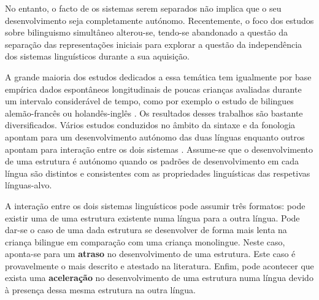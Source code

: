 \documentclass[output=paper]{LSP/langsci}
\begin{document}
No entanto, o facto de os sistemas serem separados não implica que o seu desenvolvimento seja completamente autónomo. Recentemente, o foco dos estudos sobre bilinguismo simultâneo alterou-se, tendo-se abandonado a questão da separação das representações iniciais para explorar a questão da independência dos sistemas linguísticos durante a sua aquisição. 

A grande maioria dos estudos dedicados a essa temática tem igualmente por base empírica dados espontâneos longitudinais de poucas crianças avaliadas durante um intervalo considerável de tempo, como por exemplo o estudo de bilingues alemão-francês \citep{leisel1989} ou holandês-inglês \citep{dehouwer1990}. Os resultados desses trabalhos são bastante diversificados. Vários estudos conduzidos no âmbito da sintaxe e da fonologia apontam para um desenvolvimento autónomo das duas línguas enquanto outros apontam para interação entre os dois sistemas \citep{genesee_etal2004,meisel2004}. Assume-se que o desenvolvimento de uma estrutura é autónomo quando os padrões de desenvolvimento em cada língua são distintos e consistentes com as propriedades linguísticas das respetivas línguas-alvo. 

A interação entre os dois sistemas linguísticos pode assumir três formatos: pode existir uma \textbf{} de uma estrutura existente numa língua para a outra língua. Pode dar-se o caso de uma dada estrutura se desenvolver de forma mais lenta na criança bilingue em comparação com uma criança monolingue. Neste caso, aponta-se para um \textbf{atraso} no desenvolvimento de uma estrutura. Este caso é provavelmente o mais descrito e atestado na literatura. Enfim, pode acontecer que exista uma \textbf{aceleração} no desenvolvimento de uma estrutura numa língua devido à presença dessa mesma estrutura na outra língua.\newpage
\end{document}
